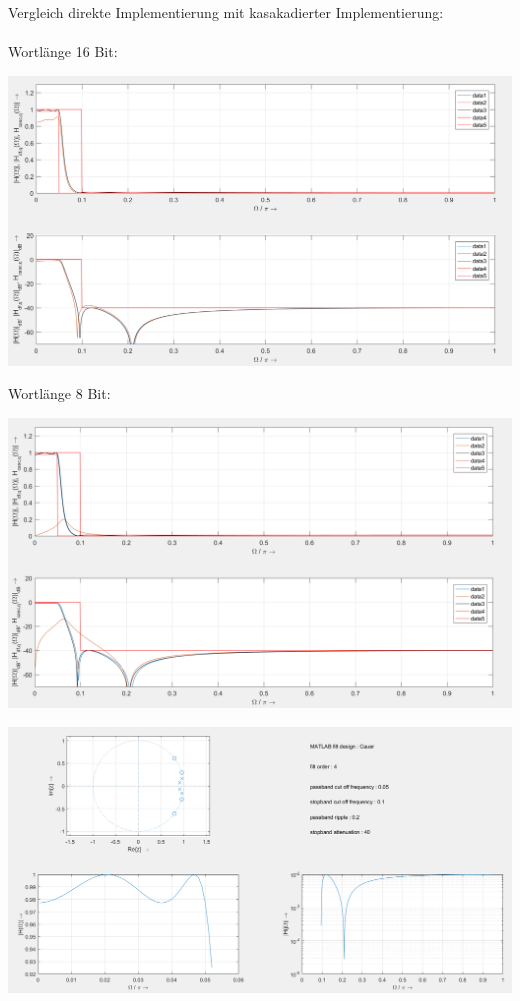 Vergleich direkte Implementierung mit kasakadierter Implementierung:\\\\
Wortlänge 16 Bit:\\
\begin{center}
\includegraphics[scale=0.55]{UE02_3_16Bit.PNG}
\end{center}
Wortlänge 8 Bit:\\
\begin{center}
\includegraphics[scale=0.55]{UE02_3_10Bit.PNG}
\end{center}

\newpage

\begin{center}
\includegraphics[scale=0.5]{UE02_3_Cauer.PNG}
\end{center}

